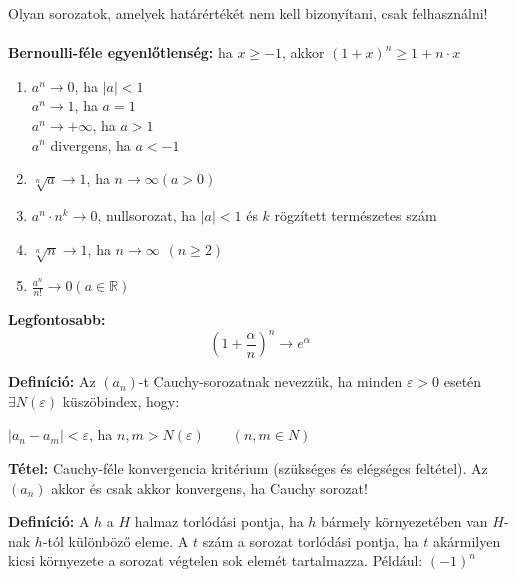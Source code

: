 \documentclass[11pt,a4paper]{article}
\begin{document}
\begin{tcolorbox}[colback=green!5!white,colframe=green!60!black,title= 3. Nevezetes sorozatok]
    Olyan sorozatok, amelyek határértékét nem kell bizonyítani, csak felhasználni!\\\\
    \textbf{Bernoulli-féle egyenlőtlenség:} ha \(x \geq  -1\), akkor \((1+x)^n \geq 1 + n\cdot x\)
    \begin{enumerate}
        \item \(a^n \to 0\), ha \(\left\lvert a\right\rvert <1\)\\
        \(a^n \to 1\), ha \(a=1\)\\
        \(a^n \to +\infty\), ha \(a>1\)\\
        \(a^n\) divergens, ha \(a<-1\)
        \item \(\sqrt[n]{a} \to 1\), ha \(n \to \infty (a>0)\)
        \item \(a^n\cdot n^k \rightarrow 0\), nullsorozat, ha \(\left\lvert a\right\rvert <1 \) és \(k\) rögzített természetes szám
        \item \(\sqrt[n]{n} \to 1\), ha \(n \to \infty \hspace{5pt}(n\geq 2)\)
        \item \(\frac{a^n}{n!} \to 0 (a \in \mathbb{R} )\)
    \end{enumerate}
    \textbf{Legfontosabb:}
    $$(1+\frac{\alpha}{n})^n \to e^{\alpha}$$
\end{tcolorbox}

\begin{tcolorbox}[colback=green!5!white,colframe=green!60!black,title= 4. Cauchy sorozat]
        \textbf{Definíció:} Az \((a_n)\)-t Cauchy-sorozatnak nevezzük, ha minden \(\varepsilon > 0\) esetén \(\exists N(\varepsilon)\) küszöbindex, hogy: 
        \begin{center}
            \(\left\lvert a_n -a_m\right\rvert  < \varepsilon\), ha \(n,m > N(\varepsilon)\) \(\hspace{15pt}\) \((n,m \in N)\)
        \end{center}
        \textbf{Tétel:} Cauchy-féle konvergencia kritérium (szükséges és elégséges feltétel). Az \((a_n)\) akkor és csak akkor konvergens, ha Cauchy sorozat!
\end{tcolorbox}

\begin{tcolorbox}[colback=green!5!white,colframe=green!60!black,title= 5. Torlódási pont]
        \textbf{Definíció:} A \(h\) a \(H\) halmaz torlódási pontja, ha \(h\) bármely környezetében van \(H\)-nak \(h\)-tól
        különböző eleme. A \(t\) szám a sorozat torlódási pontja, ha \(t\) akármilyen kicsi környezete a sorozat végtelen sok
        elemét tartalmazza. Például: \((-1)^n\)
\end{tcolorbox}
\newpage
\end{document}
